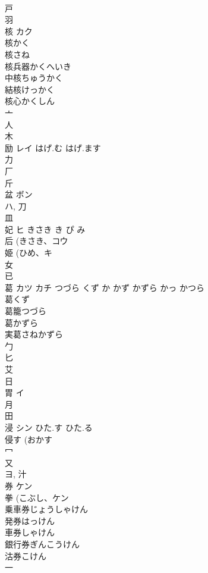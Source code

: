 \documentclass[8pt]{extreport}
\begin{document}
\begin{CJK}{UTF8}{min}
\\	戸 
\\	羽 
\\	核	カク		
\\	核かく 
\\	核さね 
\\	核兵器かくへいき 
\\	中核ちゅうかく 
\\	結核けっかく 
\\	核心かくしん 
\\	亠 
\\	人 
\\	木 
\\	励	レイ	はげ.む はげ.ます	
\\	力 
\\	厂 
\\	斤 
\\	盆	ボン		
\\	ハ, 刀 
\\	皿 
\\	妃	ヒ	きさき き ぴ み	
\\	后 (きさき、コウ 
\\	姫 (ひめ、キ 
\\	女 
\\	已 
\\	葛	カツ カチ	つづら くず か かず かずら かっ かつら	
\\	葛くず
\\	葛籠つづら 
\\	葛かずら
\\	実葛さねかずら
\\	勹 
\\	匕 
\\	艾 
\\	日 
\\	胃	イ		
\\	月 
\\	田 
\\	浸	シン	ひた.す ひた.る	
\\	侵す (おかす 
\\	冖 
\\	又 
\\	ヨ, 汁 
\\	券	ケン		
\\	拳 (こぶし、ケン 
\\	乗車券じょうしゃけん
\\	発券はっけん
\\	車券しゃけん
\\	銀行券ぎんこうけん
\\	沽券こけん
\\	一 

\end{CJK}
\end{document}
